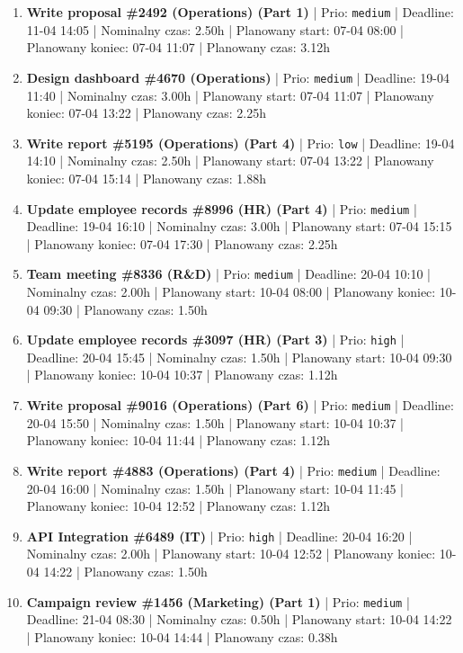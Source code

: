 {\begin{enumerate}
  \item [\textbf{14668}] \textbf{Write proposal \#2492 (Operations) (Part 1)} | Prio: \texttt{medium} | Deadline: 11-04 14:05 | Nominalny czas: 2.50h | Planowany start: 07-04 08:00 | Planowany koniec: 07-04 11:07 | Planowany czas: 3.12h
  \item [\textbf{14676}] \textbf{Design dashboard \#4670 (Operations)} | Prio: \texttt{medium} | Deadline: 19-04 11:40 | Nominalny czas: 3.00h | Planowany start: 07-04 11:07 | Planowany koniec: 07-04 13:22 | Planowany czas: 2.25h
  \item [\textbf{14687}] \textbf{Write report \#5195 (Operations) (Part 4)} | Prio: \texttt{low} | Deadline: 19-04 14:10 | Nominalny czas: 2.50h | Planowany start: 07-04 13:22 | Planowany koniec: 07-04 15:14 | Planowany czas: 1.88h
  \item [\textbf{14655}] \textbf{Update employee records \#8996 (HR) (Part 4)} | Prio: \texttt{medium} | Deadline: 19-04 16:10 | Nominalny czas: 3.00h | Planowany start: 07-04 15:15 | Planowany koniec: 07-04 17:30 | Planowany czas: 2.25h
  \item [\textbf{14649}] \textbf{Team meeting \#8336 (R\&D)} | Prio: \texttt{medium} | Deadline: 20-04 10:10 | Nominalny czas: 2.00h | Planowany start: 10-04 08:00 | Planowany koniec: 10-04 09:30 | Planowany czas: 1.50h
  \item [\textbf{14621}] \textbf{Update employee records \#3097 (HR) (Part 3)} | Prio: \texttt{high} | Deadline: 20-04 15:45 | Nominalny czas: 1.50h | Planowany start: 10-04 09:30 | Planowany koniec: 10-04 10:37 | Planowany czas: 1.12h
  \item [\textbf{14662}] \textbf{Write proposal \#9016 (Operations) (Part 6)} | Prio: \texttt{medium} | Deadline: 20-04 15:50 | Nominalny czas: 1.50h | Planowany start: 10-04 10:37 | Planowany koniec: 10-04 11:44 | Planowany czas: 1.12h
  \item [\textbf{14651}] \textbf{Write report \#4883 (Operations) (Part 4)} | Prio: \texttt{medium} | Deadline: 20-04 16:00 | Nominalny czas: 1.50h | Planowany start: 10-04 11:45 | Planowany koniec: 10-04 12:52 | Planowany czas: 1.12h
  \item [\textbf{14620}] \textbf{API Integration \#6489 (IT)} | Prio: \texttt{high} | Deadline: 20-04 16:20 | Nominalny czas: 2.00h | Planowany start: 10-04 12:52 | Planowany koniec: 10-04 14:22 | Planowany czas: 1.50h
  \item [\textbf{14653}] \textbf{Campaign review \#1456 (Marketing) (Part 1)} | Prio: \texttt{medium} | Deadline: 21-04 08:30 | Nominalny czas: 0.50h | Planowany start: 10-04 14:22 | Planowany koniec: 10-04 14:44 | Planowany czas: 0.38h

\end{enumerate}}
